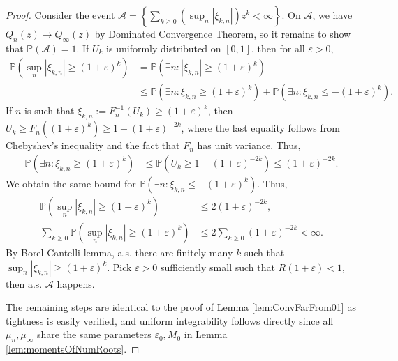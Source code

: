 \documentclass[10pt,a4paper]{amsart}
\renewcommand\P{{\mathbb{P}}}
\begin{document}
\begin{proof}
	Consider the event $\mathcal  A = \left\{\sum_{k \ge 0} \left(\sup_n |\xi_{k, n}|\right) z^k < \infty \right\}$. On $\mathcal A$, we have $Q_n (z) \to Q_\infty(z)$ by Dominated Convergence Theorem, so it remains to show that $\P(\mathcal A) = 1$. If $U_k$ is uniformly distributed on $[0, 1]$, then for all $\varepsilon > 0$, 
	\begin{align*}
		\P\left( \sup_n |\xi_{k, n}| \ge (1 + \varepsilon)^k  \right) &= \P\left( \exists n: |\xi_{k, n}| \ge (1 + \varepsilon)^k \right) \\
		&\le\P\left( \exists n: \xi_{k, n} \ge (1 + \varepsilon)^k \right) + \P\left( \exists n: \xi_{k, n} \le - (1 + \varepsilon)^k \right).
\end{align*}
If $n$ is such that $\xi_{k, n} := F_n^{-1}(U_k) \ge (1 + \varepsilon)^k$, then $U_k \ge F_n((1 + \varepsilon)^k) \ge 1 - (1 + \varepsilon)^{-2k}$, where the last equality follows from Chebyshev's inequality and the fact that $F_n$ has unit variance. Thus,
\begin{align*}
		\P\left( \exists n: \xi_{k, n} \ge (1 + \varepsilon)^k \right) &\le \P\left( U_k \ge  1 - (1 + \varepsilon)^{-2k}  \right) \le (1 + \varepsilon)^{-2k}. 
\end{align*}
We obtain the same bound for $\P\left( \exists n: \xi_{k, n} \le - (1 + \varepsilon)^k \right)$. Thus,
\begin{align*}
		\P\left( \sup_n |\xi_{k, n}| \ge (1 + \varepsilon)^k  \right) &\le 2( 1+ \varepsilon)^{-2k},  \\ 
		\sum_{k \ge 0 }\P\left( \sup_n |\xi_{k, n}| \ge (1 + \varepsilon)^k  \right) &\le 2 \sum_{k \ge 0}( 1+ \varepsilon)^{-2k} < \infty.
	\end{align*}
	By Borel-Cantelli lemma, a.s. there are finitely many $k$ such that $\sup_n |\xi_{k, n}| \ge (1 + \varepsilon)^k$. Pick $\varepsilon > 0$ sufficiently small such that $R (1 + \varepsilon) < 1$, then a.s. $\mathcal A$ happens.
	
	The remaining steps are identical to the proof of Lemma \ref{lem:ConvFarFrom01} as tightness is easily verified, and uniform integrability follows directly since all $\mu_n, \mu_\infty$ share the same parameters $\varepsilon_0, M_0$ in Lemma \ref{lem:momentsOfNumRoots}.
\end{proof}
\end{document}
